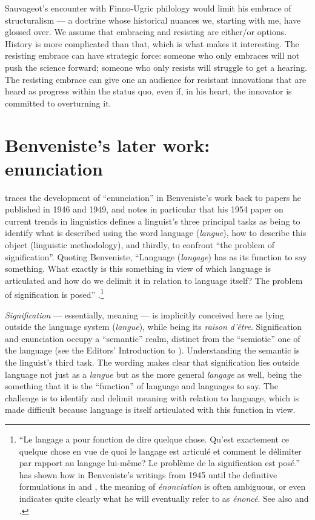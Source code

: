 \documentclass[output=paper]{langscibook}
\begin{document}
Sauvageot's encounter with Finno-Ugric philology would limit his embrace of structuralism — a doctrine whose historical nuances we, starting with me, have glossed over. We assume that embracing and resisting are either/or options. History is more complicated than that, which is what makes it interesting. The resisting embrace can have strategic force: someone who only embraces will not push the science forward; someone who only resists will struggle to get a hearing. The resisting embrace can give one an audience for resistant innovations that are heard as progress within the status quo, even if, in his heart, the innovator is committed to overturning it.

\section{Benveniste’s later work: enunciation}
\label{sec:joseph:laterwork}

\citet{Normand1986} traces the development of ``enunciation'' in Benveniste's work back to papers he published in 1946 and 1949, and notes in particular that his 1954 paper on current trends in linguistics defines a linguist's three principal tasks as being to identify what is described using the word language (\emph{langue}), how to describe this object (linguistic methodology), and thirdly, to confront ``the problem of signification''. Quoting Benveniste, ``Language (\emph{langage}) has as its function to say something. What exactly is this something in view of which language is articulated and how do we delimit it in relation to language itself? The problem of signification is posed'' \citep[7]{Benveniste1954}.\footnote{``Le langage a pour fonction de dire quelque chose. Qu'est exactement ce quelque chose en vue de quoi le langage est articulé et comment le délimiter par rapport au langage lui-même? Le problème de la signification est posé.'' \citet[27--57]{Ono2007} has shown how in Benveniste's writings from 1945 until the definitive formulations in \citeyear{Benveniste1969semiologie} and \citeyear{Benveniste1970appareil}, the meaning of \emph{énonciation} is often ambiguous, or even indicates quite clearly what he will eventually refer to as \emph{énoncé}. See also \citet{Coquet1987} and \citet{JosephInPress}.}

\emph{Signification} — essentially, meaning — is implicitly conceived here as lying outside the language system (\emph{langue}), while being its \emph{raison d’être}. Signification and enunciation occupy a ``semantic'' realm, distinct from the ``semiotic'' one of the language (see the Editors' Introduction to \citealt[49--51]{Benveniste2012}). Understanding the semantic is the linguist's third task. The wording makes clear that signification lies outside language not just as a \emph{langue} but as the more general \emph{langage} as well, being the something that it is the ``function'' of language and languages to say. The challenge is to identify and delimit meaning with relation to language, which is made difficult because language is itself articulated with this function in view.
\end{document}
